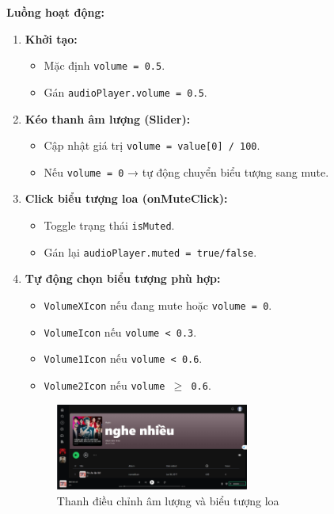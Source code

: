 \textbf{Luồng hoạt động:}
\begin{enumerate}
  \item \textbf{Khởi tạo:}
  \begin{itemize}
    \item Mặc định \texttt{volume = 0.5}.
    \item Gán \texttt{audioPlayer.volume = 0.5}.
  \end{itemize}

  \item \textbf{Kéo thanh âm lượng (Slider):}
  \begin{itemize}
    \item Cập nhật giá trị \texttt{volume = value[0] / 100}.
    \item Nếu \texttt{volume = 0} → tự động chuyển biểu tượng sang mute.
  \end{itemize}

  \item \textbf{Click biểu tượng loa (onMuteClick):}
  \begin{itemize}
    \item Toggle trạng thái \texttt{isMuted}.
    \item Gán lại \texttt{audioPlayer.muted = true/false}.
  \end{itemize}

  \item \textbf{Tự động chọn biểu tượng phù hợp:}
  \begin{itemize}
    \item \texttt{VolumeXIcon} nếu đang mute hoặc \texttt{volume = 0}.
    \item \texttt{VolumeIcon} nếu \texttt{volume < 0.3}.
    \item \texttt{Volume1Icon} nếu \texttt{volume < 0.6}.
    \item \texttt{Volume2Icon} nếu \texttt{volume $\geq$ 0.6}.
  \end{itemize}
\begin{figure}[H]
    \centering
    \includegraphics[width=0.6\textwidth]{imgs/trienkhaife/volume.png}
    \caption{Thanh điều chỉnh âm lượng và biểu tượng loa}
  \end{figure}

\end{enumerate}
